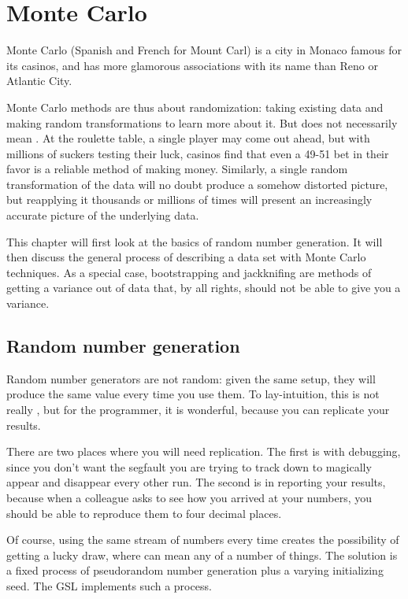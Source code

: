 \chapter{Monte Carlo} \label{boot} 

Monte Carlo (Spanish and French for Mount Carl) is a city in Monaco
famous for its casinos, and has more glamorous associations with its name
than Reno or Atlantic City.

Monte Carlo methods are thus about randomization: taking existing data
and making random transformations to learn more about it. But
 does not necessarily mean .
At the
roulette table, a single player may come out ahead, but with millions of
suckers testing their luck, casinos find that even a 49-51 bet in their
favor is a reliable method of
making money.  Similarly, a single random transformation of the data will
no doubt produce a somehow distorted picture, but reapplying it thousands
or millions of times will present an increasingly accurate picture of
the underlying data.

This chapter will first look at the basics of random number generation.
It will then discuss the general process of describing a data set with
Monte Carlo techniques.  As a special case,
bootstrapping and jackknifing are methods of getting a variance out of
data that, by all rights, should not be able to give you a variance. 

\section{Random number generation}\label{randomnumbers}\label{rngs}
Random number generators are not random: given the same setup, they
will produce the same value every time you use them. To lay-intuition,
this is not really , but for the programmer, it is wonderful,
because you can replicate your results.

There are two places where you will need replication. The first is with
debugging, since you don't want the segfault you are trying to track
down to magically appear and disappear every other run. The second is
in reporting your results, because when a colleague asks to see how you
arrived at your numbers, you should be able to reproduce them to four
decimal places.

Of course, using the same stream of numbers every time creates the
possibility of getting a lucky draw, where  can mean any of a
number of things. The solution is a fixed process of pseudorandom
number generation plus a varying initializing seed. The GSL implements
such a process.


